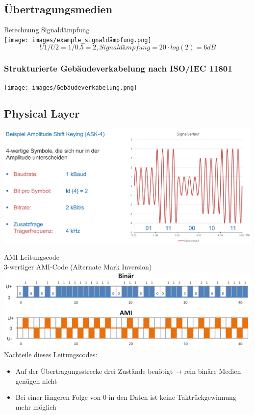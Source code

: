 \subsection*{Übertragungsmedien}

\begin{example2}{Berechnung Signaldämpfung}\\
    \texttt{[image: images/example\_signaldämpfung.png]}
    $$U1/U2 = 1/0.5 = 2, Signaldämpfung = 20 \cdot log(2) = 6dB$$
\end{example2}

\subsubsection{Strukturierte Gebäudeverkabelung nach ISO/IEC 11801}
        \centering
        \texttt{[image: images/Gebäudeverkabelung.png]}

\subsection*{Physical Layer}

\begin{example}
    \includegraphics[width=1\linewidth]{images/amplitude_shift_keying.png}
\end{example}

\begin{concept}{AMI Leitungscode}\\
    3-wertiger AMI-Code (Alternate Mark Inversion)\\
    \includegraphics[width=0.8\linewidth]{images/gleichspannungsfreiheit.png}\\
    Nachteile dieses Leitungscodes:
    \begin{itemize}
        \item Auf der Übertragungsstrecke drei Zustände benötigt → rein binäre Medien genügen nicht
        \item Bei einer längeren Folge von 0 in den Daten ist keine Taktrückgewinnung mehr möglich
    \end{itemize}
\end{concept}

